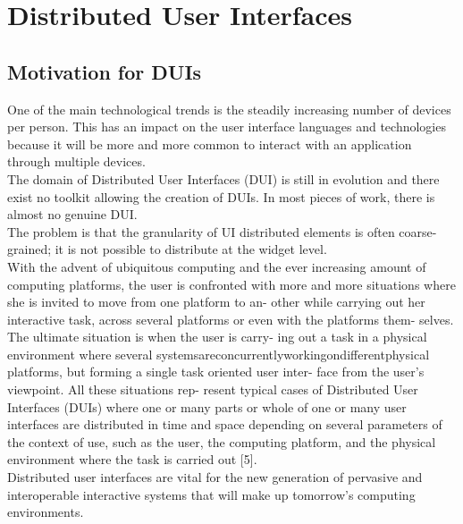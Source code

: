 \section{Distributed User Interfaces}
\subsection{Motivation for DUIs}

\cite{manca2011distributing} One of the main technological trends is the
steadily increasing number of devices per person. This has an impact on the user
interface languages and technologies because it will be more and more common to
interact with an application through multiple devices.\\

\cite{melchior2011distribution}The domain of Distributed User Interfaces (DUI) is still in evolution and there exist no toolkit allowing the creation of DUIs.
In most pieces of work, there is almost no genuine DUI. \\

\cite{melchior2011distribution}The problem is that the granularity of UI
distributed elements is often coarse-grained; it is not possible to distribute
at the widget level.\\

\cite{demeure20084c}With the advent of ubiquitous computing and the ever increasing amount of computing platforms, the user is confronted with more and more situations where she is invited to move from one platform to an- other
while carrying out her interactive task, across several platforms or even with
the platforms them- selves. The ultimate situation is when the user is carry-
ing out a task in a physical environment where several systemsareconcurrentlyworkingondifferentphysical platforms, but forming a single task oriented user inter- face from the user’s viewpoint. All these situations rep- resent typical cases of Distributed User Interfaces (DUIs) where one or many parts or whole of one or many user interfaces are distributed in time and space depending on several parameters of the context of use, such as the user, the computing platform, and the physical environment where the task is carried out [5].\\

\cite{elmqvist2011distributed}Distributed user interfaces are vital for the new
generation of pervasive and interoperable interactive systems that will make up tomorrow’s computing environments. \\

